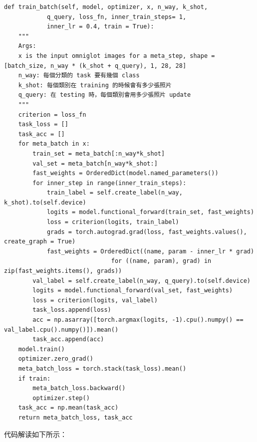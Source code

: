 \begin{lstlisting}
def train_batch(self, model, optimizer, x, n_way, k_shot, 
            q_query, loss_fn, inner_train_steps= 1, 
            inner_lr = 0.4, train = True):
    """
    Args:
    x is the input omniglot images for a meta_step, shape = [batch_size, n_way * (k_shot + q_query), 1, 28, 28]
    n_way: 每個分類的 task 要有幾個 class
    k_shot: 每個類別在 training 的時候會有多少張照片
    q_query: 在 testing 時，每個類別會用多少張照片 update
    """
    criterion = loss_fn
    task_loss = []
    task_acc = []
    for meta_batch in x:
        train_set = meta_batch[:n_way*k_shot]
        val_set = meta_batch[n_way*k_shot:]
        fast_weights = OrderedDict(model.named_parameters())
        for inner_step in range(inner_train_steps):
            train_label = self.create_label(n_way, k_shot).to(self.device)
            logits = model.functional_forward(train_set, fast_weights)
            loss = criterion(logits, train_label)
            grads = torch.autograd.grad(loss, fast_weights.values(), create_graph = True)
            fast_weights = OrderedDict((name, param - inner_lr * grad)
                              for ((name, param), grad) in zip(fast_weights.items(), grads))
        val_label = self.create_label(n_way, q_query).to(self.device)
        logits = model.functional_forward(val_set, fast_weights)
        loss = criterion(logits, val_label)
        task_loss.append(loss)
        acc = np.asarray([torch.argmax(logits, -1).cpu().numpy() == val_label.cpu().numpy()]).mean()
        task_acc.append(acc)
    model.train()
    optimizer.zero_grad()
    meta_batch_loss = torch.stack(task_loss).mean()
    if train:
        meta_batch_loss.backward()
        optimizer.step()
    task_acc = np.mean(task_acc)
    return meta_batch_loss, task_acc
\end{lstlisting}
代码解读如下所示：
